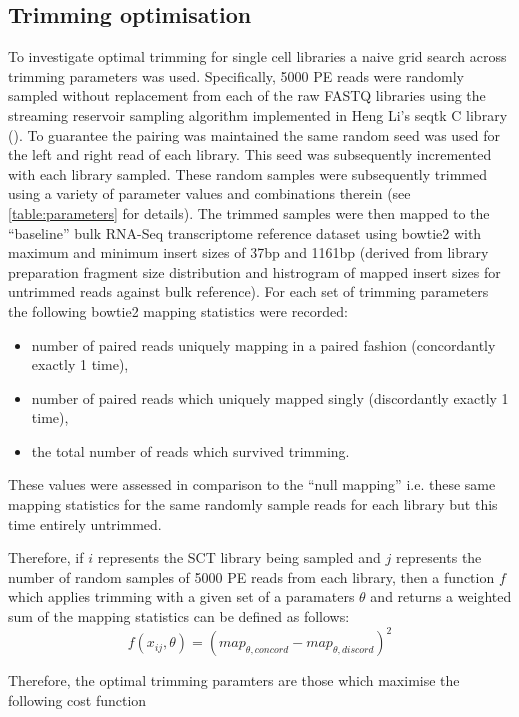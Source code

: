 \subsection{Trimming optimisation}
To investigate optimal trimming for single cell libraries a naive grid search across trimming parameters was used.
Specifically, 5000 PE reads were randomly sampled without replacement from each of the raw FASTQ libraries 
using the streaming reservoir sampling \citep{Vitter1985} algorithm implemented in Heng Li's 
seqtk C library (\citep{SeqtkGitHub}).
To guarantee the pairing was maintained the same random seed was used for the left and right read
of each library. This seed was subsequently incremented with each library sampled.
These random samples were subsequently trimmed using a variety of parameter values and combinations therein 
(see \ref{table:parameters} for details).
The trimmed samples were then mapped to the ``baseline'' bulk RNA-Seq transcriptome reference dataset using bowtie2
\citep{Langmead2012} with maximum and minimum insert sizes of 37bp and 1161bp (derived from library preparation
fragment size distribution and histrogram of mapped insert sizes for untrimmed reads against bulk reference).
For each set of trimming parameters the following bowtie2 mapping statistics were recorded: 
\begin{itemize}
    \item number of paired reads uniquely mapping in a paired 
fashion (concordantly exactly 1 time), 
    \item number of paired reads which uniquely mapped 
singly (discordantly exactly 1 time), 
    \item the total number of reads which survived trimming.
\end{itemize}

These values were assessed in comparison to the ``null mapping'' i.e. these same mapping statistics for the same
randomly sample reads for each library but this time entirely untrimmed.  

Therefore, if \(i\) represents the SCT library being sampled and \(j\) represents the number of random samples of
5000 PE reads from each library, then a function \(f\) which applies trimming with a given set of a 
paramaters \(\theta\) and returns a weighted sum of the mapping statistics can be defined as follows:
\[
    f(x_{ij}, \theta) = (map_{\theta,concord} - map_{\theta,discord})^{2}

\]

Therefore, the optimal trimming paramters \theta are those which maximise the following cost function

